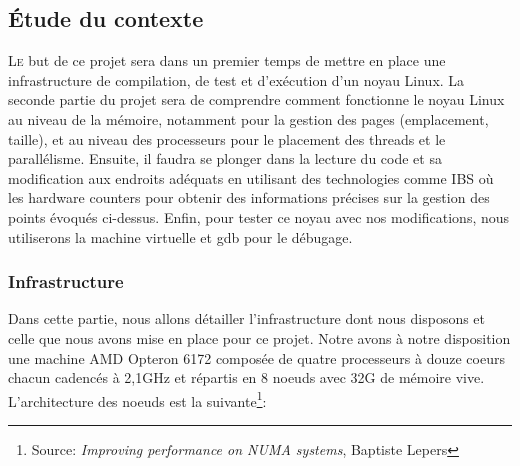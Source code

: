 \subsection{Étude du contexte}

  \lettrine[nindent=0em,lines=3]{L}e but de ce projet sera dans un premier temps
  de mettre en place une infrastructure de compilation, de test et d'exécution
  d'un noyau Linux. La seconde partie du projet sera de comprendre comment
  fonctionne le noyau Linux au niveau de la mémoire, notamment pour la gestion
  des pages (emplacement, taille), et au niveau des processeurs pour le
  placement des threads et le parallélisme. Ensuite, il faudra se plonger dans
  la lecture du code et sa modification aux endroits adéquats en utilisant des
  technologies comme IBS où les hardware counters pour obtenir des informations
  précises sur la gestion des points évoqués ci-dessus. Enfin, pour tester ce
  noyau avec nos modifications, nous utiliserons la machine virtuelle et gdb
  pour le débugage.

  \subsubsection{Infrastructure}
    Dans cette partie, nous allons détailler l'infrastructure dont nous
    disposons et celle que nous avons mise en place pour ce projet. Notre avons
    à notre disposition une machine AMD Opteron 6172 composée de quatre
    processeurs à douze coeurs chacun cadencés à 2,1GHz et répartis en 8 noeuds
    avec 32G de mémoire vive. L'architecture des noeuds est la
    suivante\footnote{Source: \textit{Improving performance on NUMA systems},
      Baptiste Lepers}:



